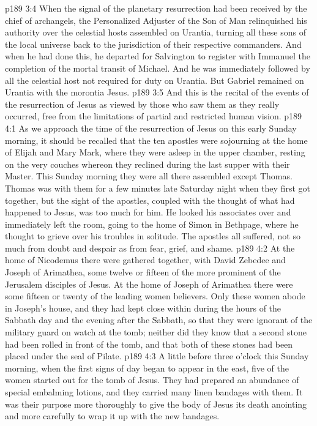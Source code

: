 \pc \vs p189 3:4 When the signal of the planetary resurrection had been received by the chief of archangels, the Personalized Adjuster of the Son of Man relinquished his authority over the celestial hosts assembled on Urantia, turning all these sons of the local universe back to the jurisdiction of their respective commanders. And when he had done this, he departed for Salvington to register with Immanuel the completion of the mortal transit of Michael. And he was immediately followed by all the celestial host not required for duty on Urantia. But Gabriel remained on Urantia with the morontia Jesus.
\pc \vs p189 3:5 And this is the recital of the events of the resurrection of Jesus as viewed by those who saw them as they really occurred, free from the limitations of partial and restricted human vision.
\vs p189 4:1 As we approach the time of the resurrection of Jesus on this early Sunday morning, it should be recalled that the ten apostles were sojourning at the home of Elijah and Mary Mark, where they were asleep in the upper chamber, resting on the very couches whereon they reclined during the last supper with their Master. This Sunday morning they were all there assembled except Thomas. Thomas was with them for a few minutes late Saturday night when they first got together, but the sight of the apostles, coupled with the thought of what had happened to Jesus, was too much for him. He looked his associates over and immediately left the room, going to the home of Simon in Bethpage, where he thought to grieve over his troubles in solitude. The apostles all suffered, not so much from doubt and despair as from fear, grief, and shame.
\pc \vs p189 4:2 At the home of Nicodemus there were gathered together, with David Zebedee and Joseph of Arimathea, some twelve or fifteen of the more prominent of the Jerusalem disciples of Jesus. At the home of Joseph of Arimathea there were some fifteen or twenty of the leading women believers. Only these women abode in Joseph’s house, and they had kept close within during the hours of the Sabbath day and the evening after the Sabbath, so that they were ignorant of the military guard on watch at the tomb; neither did they know that a second stone had been rolled in front of the tomb, and that both of these stones had been placed under the seal of Pilate.
\vs p189 4:3 A little before three o’clock this Sunday morning, when the first signs of day began to appear in the east, five of the women started out for the tomb of Jesus. They had prepared an abundance of special embalming lotions, and they carried many linen bandages with them. It was their purpose more thoroughly to give the body of Jesus its death anointing and more carefully to wrap it up with the new bandages.
